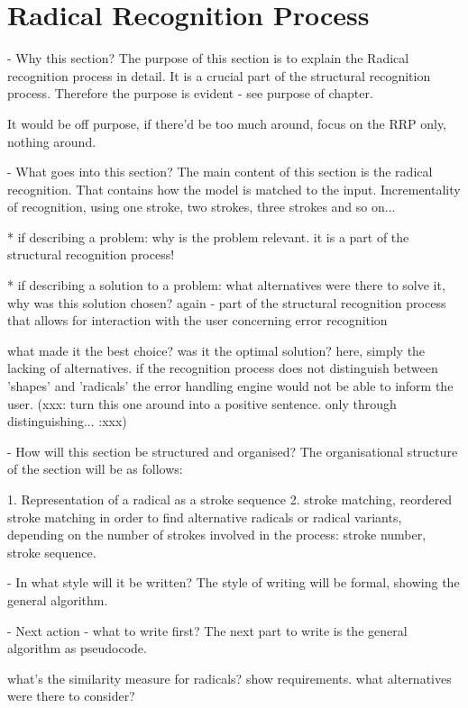 \section{Radical Recognition Process}
\label{sec:hwre:radicalrecognitionprocess}

- Why this section? 
  The purpose of this section is to explain the Radical recognition process in
  detail. It is a crucial part of the structural recognition process.
  Therefore the purpose is evident - see purpose of chapter.

  It would be off purpose, if there'd be too much around,
  focus on the RRP only, nothing around.

- What goes into this section?
  The main content of this section is the radical recognition.
  That contains how the model is matched to the input.
  Incrementality of recognition, using one stroke, two strokes,
  three strokes and so on...

  * if describing a problem: why is the problem relevant.
    it is a part of the structural recognition process!

  * if describing a solution to a problem: what alternatives were
    there to solve it, why was this solution chosen? 
    again - part of the structural recognition process that allows for
    interaction with the user concerning error recognition

    what made it the best choice? was it the optimal solution?
    here, simply the lacking of alternatives. if the recognition process
    does not distinguish between 'shapes' and 'radicals' the error
    handling engine would not be able to inform the user.
    (xxx: turn this one around into a positive sentence. 
    only through distinguishing... :xxx)
    
- How will this section be structured and organised?
  The organisational structure of the section will be as follows:

    1. Representation of a radical as a stroke sequence
    2. stroke matching, reordered stroke matching in order to find 
       alternative radicals or radical variants, depending on the 
       number of strokes involved in the process: stroke number, stroke sequence.

- In what style will it be written?
  The style of writing will be formal, showing the general algorithm.

- Next action - what to write first?
  The next part to write is the general algorithm as pseudocode.

what's the similarity measure for
radicals?
show requirements.
what alternatives were there to consider?

